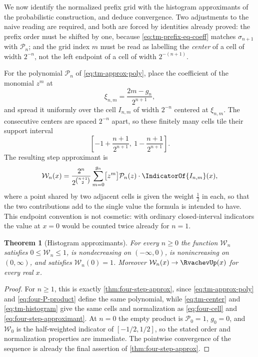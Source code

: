 \documentclass[11pt,oneside]{article}
\newtheorem{theorem}{Theorem}[section]
\theoremstyle{definition}
\theoremstyle{remark}
\begin{document}
We now identify the normalized prefix grid with the histogram approximants of the
probabilistic construction, and deduce convergence.  Two adjustments to the naive reading
are required, and both are forced by identities already proved: the prefix order must be
shifted by one, because \eqref{eq:tm-prefix-eq-coeff} matches $\sigma_{n+1}$ with $\mathcal P_n$; and
the grid index $m$ must be read as labelling the \emph{center} of a cell of width $2^{-n}$,
not the left endpoint of a cell of width $2^{-(n+1)}$.

For the polynomial $\mathcal P_n$ of \eqref{eq:tm-approx-poly}, place the coefficient of
the monomial $z^m$ at
\begin{equation}
 \xi_{n,m}=\frac{2m-g_n}{2^{n+1}},                    \label{eq:tm-center}
\end{equation}
and spread it uniformly over the cell $I_{n,m}$ of width $2^{-n}$ centered at $\xi_{n,m}$.
The consecutive centers are spaced $2^{-n}$ apart, so these finitely many cells tile their
support interval
\[
 \left[-1+\frac{n+1}{2^{n+1}},\ 1-\frac{n+1}{2^{n+1}}\right].
\]
The resulting step approximant is
\begin{equation}
 \mathcal W_n(x)=\frac{2^n}{2^{\binom{n+1}2}}
 \sum_{m=0}^{g_n}\bigl[z^m\bigr]\mathcal P_n(z)\cdot
 \IndicatorOf{I_{n,m}}(x),                                 \label{eq:tm-histogram}
\end{equation}
where a point shared by two adjacent cells is given the weight $\tfrac12$ in each, so that
the two contributions add to the single value the formula is intended to have.  This
endpoint convention is not cosmetic: with ordinary closed-interval indicators the value at
$x=0$ would be counted twice already for $n=1$.

\begin{theorem}[Histogram approximants]
\label{thm:tm-histogram-limit}
For every $n\ge0$ the function $\mathcal W_n$ satisfies $0\le\mathcal W_n\le1$, is nondecreasing on
$(-\infty,0)$, is nonincreasing on $(0,\infty)$, and satisfies $\mathcal W_n(0)=1$.  Moreover
$\mathcal W_n(x)\to\RvachevUp(x)$ for every real $x$.
\end{theorem}

\begin{proof}
For $n\ge1$, this is exactly \cref{thm:four-step-approx}, since
\eqref{eq:tm-approx-poly} and \eqref{eq:four-P-product} define the same polynomial, while
\eqref{eq:tm-center} and \eqref{eq:tm-histogram} give the same cells and normalization as
\eqref{eq:four-cell} and \eqref{eq:four-step-approximant}.  At $n=0$ the empty product is
$\mathcal P_0=1$, $g_0=0$, and $\mathcal W_0$ is the half-weighted indicator of
$[-1/2,1/2]$, so the stated order and normalization properties are immediate.  The
pointwise convergence of the sequence is already the final assertion of
\cref{thm:four-step-approx}.
\end{proof}
\end{document}
